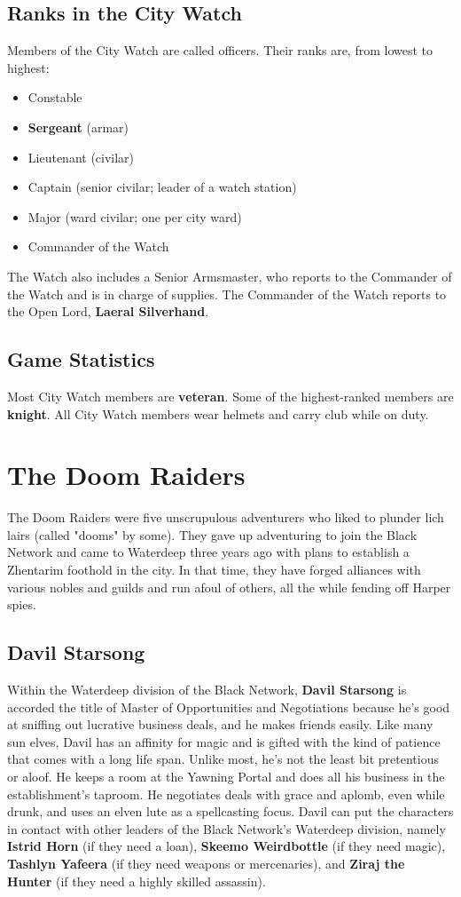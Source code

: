 \documentclass[10pt,a4paper,twoside,twocolumn,openany,nodeprecatedcode]{dndbook}
\begin{document}
\subsection{Ranks in the City Watch}
Members of the City Watch are called officers. Their ranks are, from lowest to highest:
\begin{itemize}

\item Constable
\item \textbf{Sergeant} (armar)
\item Lieutenant (civilar)
\item Captain (senior civilar; leader of a watch station)
\item Major (ward civilar; one per city ward)
\item Commander of the Watch
\end{itemize}


The Watch also includes a Senior Armsmaster, who reports to the Commander of the Watch and is in charge of supplies. The Commander of the Watch reports to the Open Lord, \textbf{Laeral Silverhand}.
\subsection{Game Statistics}
Most City Watch members are \textbf{veteran}. Some of the highest-ranked members are \textbf{knight}. All City Watch members wear helmets and carry club while on duty.
\section{The Doom Raiders}
The Doom Raiders were five unscrupulous adventurers who liked to plunder lich lairs (called "dooms" by some). They gave up adventuring to join the Black Network and came to Waterdeep three years ago with plans to establish a Zhentarim foothold in the city. In that time, they have forged alliances with various nobles and guilds and run afoul of others, all the while fending off Harper spies.
\subsection{Davil Starsong}
Within the Waterdeep division of the Black Network, \textbf{Davil Starsong} is accorded the title of Master of Opportunities and Negotiations because he's good at sniffing out lucrative business deals, and he makes friends easily.
Like many sun elves, Davil has an affinity for magic and is gifted with the kind of patience that comes with a long life span. Unlike most, he's not the least bit pretentious or aloof. He keeps a room at the Yawning Portal and does all his business in the establishment's taproom. He negotiates deals with grace and aplomb, even while drunk, and uses an elven lute as a spellcasting focus.
Davil can put the characters in contact with other leaders of the Black Network's Waterdeep division, namely \textbf{Istrid Horn} (if they need a loan), \textbf{Skeemo Weirdbottle} (if they need magic), \textbf{Tashlyn Yafeera} (if they need weapons or mercenaries), and \textbf{Ziraj the Hunter} (if they need a highly skilled assassin).
\end{document}

